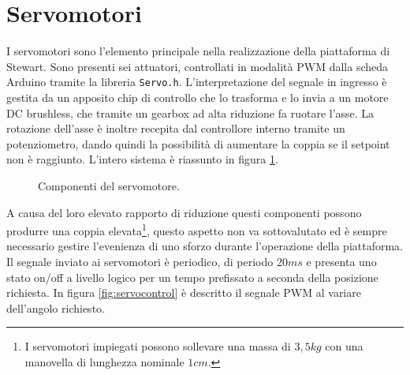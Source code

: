 \documentclass[12pt,twoside,openright]{report}
\begin{document}
\section{Servomotori}\label{servomotori}
I servomotori sono l'elemento principale nella realizzazione della piattaforma di Stewart. Sono presenti sei attuatori, controllati in modalità PWM dalla scheda Arduino tramite la libreria \texttt{Servo.h}. L'interpretazione del segnale in ingresso è gestita da un apposito chip di controllo che lo trasforma e lo invia a un motore DC brushless, che tramite un gearbox ad alta riduzione fa ruotare l'asse. La rotazione dell'asse è inoltre recepita dal controllore interno tramite un potenziometro, dando quindi la possibilità di aumentare la coppia se il setpoint non è raggiunto. L'intero sistema è riassunto in figura \ref{fig:servo}. 
\begin{figure}[h!]
\centering
{}
\caption{Componenti del servomotore.} \label{fig:servo}
\end{figure}
A causa del loro elevato rapporto di riduzione questi componenti possono produrre una coppia elevata\footnote{I servomotori impiegati possono sollevare una massa di $3,5kg$ con una manovella di lunghezza nominale $1cm$.}, questo aspetto  non va sottovalutato ed è sempre necessario gestire l'evenienza di uno sforzo durante l'operazione della piattaforma.
Il segnale inviato ai servomotori è periodico, di periodo $20ms$ e presenta uno stato on/off a livello logico per un tempo prefissato a seconda della posizione richiesta. In figura \ref{fig:servocontrol} è descritto il segnale PWM al variare dell'angolo richiesto. 
\end{document}
